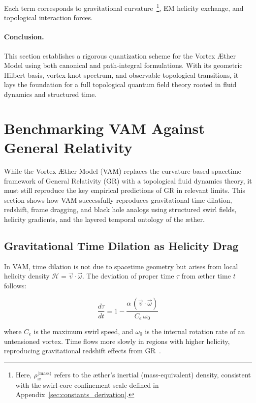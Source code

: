 \documentclass[12pt]{article}
\begin{document}
    Each term corresponds to gravitational curvature~\footnote{Here, \textbf{\boldmath\( \rho_{\text{\ae}}^{\text{(mass)}} \)} refers to the æther’s inertial (mass-equivalent) density, consistent with the swirl-core confinement scale defined in Appendix~\ref{sec:constants_derivation}.
}, EM helicity exchange, and topological interaction forces.

    \paragraph{Conclusion.} This section establishes a rigorous quantization scheme for the Vortex \AE{}ther Model using both canonical and path-integral formulations. With its geometric Hilbert basis, vortex-knot spectrum, and observable topological transitions, it lays the foundation for a full topological quantum field theory rooted in fluid dynamics and structured time.


\section{Benchmarking VAM Against General Relativity}
    While the Vortex \AE{}ther Model (VAM) replaces the curvature-based spacetime framework of General Relativity (GR) with a topological fluid dynamics theory, it must still reproduce the key empirical predictions of GR in relevant limits. This section shows how VAM successfully reproduces gravitational time dilation, redshift, frame dragging, and black hole analogs using structured swirl fields, helicity gradients, and the layered temporal ontology of the æther.

    \subsection{Gravitational Time Dilation as Helicity Drag}
    In VAM, time dilation is not due to spacetime geometry but arises from local helicity density \( \mathcal{H} = \vec{v} \cdot \vec{\omega} \). The deviation of proper time \( \tau \) from æther time \( t \) follows:

    \begin{equation}
    \frac{d\tau}{dt} = 1 - \frac{\alpha \, (\vec{v} \cdot \vec{\omega})}{C_e \, \omega_0}
    \label{eq:vam_time_dilation}
    \end{equation}

    where \( C_e \) is the maximum swirl speed, and \( \omega_0 \) is the internal rotation rate of an untensioned vortex. Time flows more slowly in regions with higher helicity, reproducing gravitational redshift effects from GR~\cite{volovik2003universe}.
\end{document}
